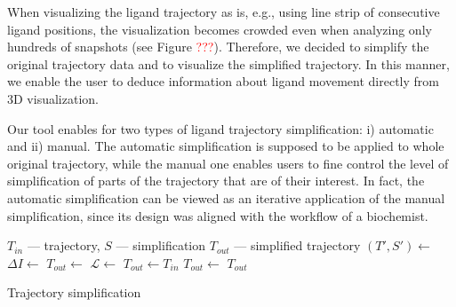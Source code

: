 When visualizing the ligand trajectory as is, e.g., using line strip of consecutive ligand positions, the visualization becomes crowded even when analyzing only hundreds of snapshots (see Figure \textcolor{red}{???}).
Therefore, we decided to simplify the original trajectory data and to visualize the simplified trajectory.
In this manner, we enable the user to deduce information about ligand movement directly from 3D visualization.

Our tool enables for two types of ligand trajectory simplification: i) automatic and ii) manual.
The automatic simplification is supposed to be applied to whole original trajectory, while the manual one enables users to fine control the level of simplification of parts of the trajectory that are of their interest.
In fact, the automatic simplification can be viewed as an iterative application of the manual simplification, since its design was aligned with the workflow of a biochemist.

\begin{algorithm}
  \begin{algorithmic}[1]
	  \Require $T_{in}$ --- trajectory, $S$ --- simplification
	  \Ensure $T_{out}$ --- simplified trajectory
			\State $(T', S') \gets$  
			\State
			  \State $\Delta I \gets$ 
				\State $T_{out} \gets$ 
			\Else %
			  \State $\mathcal{L} \gets$  
				\State $T_{out} \gets T_{in}$
				 
					  \State $T_{out} \gets$ 
					\EndFor
				\EndFor
			\EndIf
			\State
			\State {}
			\State \Return $T_{out}$
		\EndProcedure
  \end{algorithmic}
	\caption{Trajectory simplification}
  \label{alg:simplify}
\end{algorithm}

